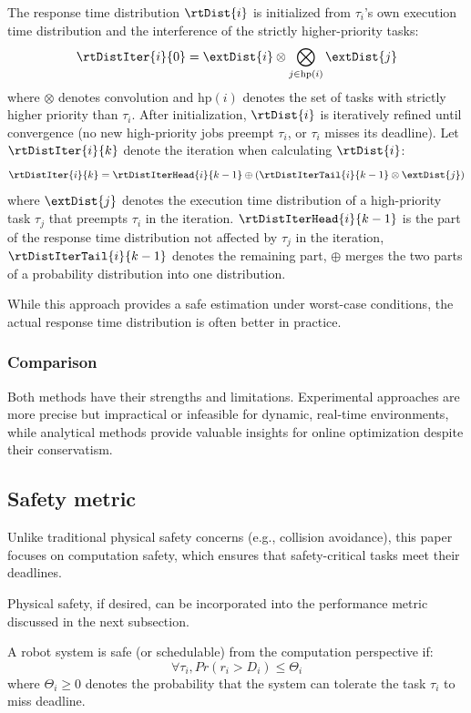     The response time distribution $\rtDist{i}$ is initialized from $\tau_i$'s own execution time distribution and the interference of the strictly higher-priority tasks:
	\begin{equation}
		\rtDistIter{i}{0} = \extDist{i} \otimes \bigotimes_{j \in \text{hp}(i)} \extDist{j}
	\end{equation}
	where $\otimes$ denotes convolution and $\text{hp}(i)$ denotes the set of tasks with strictly higher priority than $\tau_i$.
    After initialization, $\rtDist{i}$ is iteratively refined until convergence (\ie no new high-priority jobs preempt $\tau_i$, or $\tau_i$ misses its deadline).
    Let $\rtDistIter{i}{k}$ denote the  iteration when calculating $\rtDist{i}$:
	\begin{equation}
		\rtDistIter{i}{k} = \rtDistIterHead{i}{k-1} \oplus (\rtDistIterTail{i}{k-1} \otimes \extDist{j})
		\label{eq_prob_rta}
	\end{equation}
	where $\extDist{j}$ denotes the execution time distribution of a high-priority task $\tau_j$ that preempts $\tau_i$ in the  iteration.
    $\rtDistIterHead{i}{k-1}$ is the part of the response time distribution not affected by $\tau_j$ in the  iteration, $\rtDistIterTail{i}{k-1}$ denotes the remaining part, $\oplus$ merges the two parts of a probability distribution into one distribution.

    While this approach provides a safe estimation under worst-case conditions, the actual response time distribution is often better in practice.

    \subsubsection{Comparison}
    Both methods have their strengths and limitations.
    Experimental approaches are more precise but impractical or infeasible for dynamic, real-time environments, while analytical methods provide valuable insights for online optimization despite their conservatism.

	\subsection{Safety metric}
    Unlike traditional physical safety concerns (e.g., collision avoidance), this paper focuses on computation safety, which ensures that safety-critical tasks meet their deadlines.

    Physical safety, if desired, can be incorporated into the performance metric discussed in the next subsection.
	\begin{definition}
		A robot system is safe (or schedulable) from the computation perspective if:
		\begin{equation}
			\forall \tau_i, Pr(r_i > D_i) \leq \Theta_i
			\label{eq_safety}
		\end{equation}
		where $\Theta_i \geq 0$ denotes the probability that the system can tolerate the task $\tau_i$ to miss deadline.
	\end{definition}

